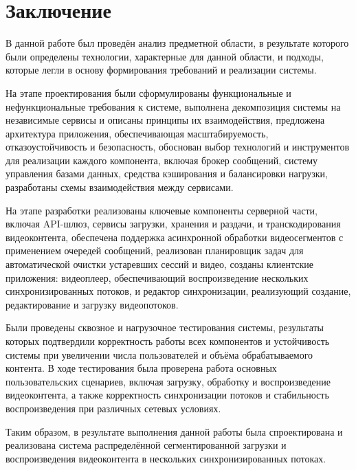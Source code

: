 \chapter*{Заключение} \label{ch-conclusion}

	В данной работе был проведён анализ предметной области, в результате которого были определены технологии, характерные для данной области, и подходы, которые легли в основу формирования требований и реализации системы.

	На этапе проектирования были сформулированы функциональные и нефункциональные требования к системе, выполнена декомпозиция системы на независимые сервисы и описаны принципы их взаимодействия, предложена архитектура приложения, обеспечивающая масштабируемость, отказоустойчивость и безопасность, обоснован выбор технологий и инструментов для реализации каждого компонента, включая брокер сообщений, систему управления базами данных, средства кэширования и балансировки нагрузки, разработаны схемы взаимодействия между сервисами.

	На этапе разработки реализованы ключевые компоненты серверной части, включая API-шлюз, сервисы загрузки, хранения и раздачи, и транскодирования видеоконтента, обеспечена поддержка асинхронной обработки видеосегментов с применением очередей сообщений, реализован планировщик задач для автоматической очистки устаревших сессий и видео, созданы клиентские приложения: видеоплеер, обеспечивающий воспроизведение нескольких синхронизированных потоков, и редактор синхронизации, реализующий создание, редактирование и загрузку видеопотоков.

	Были проведены сквозное и нагрузочное тестирования системы, результаты которых подтвердили корректность работы всех компонентов и устойчивость системы при увеличении числа пользователей и объёма обрабатываемого контента. В ходе тестирования была проверена работа основных пользовательских сценариев, включая загрузку, обработку и воспроизведение видеоконтента, а также корректность синхронизации потоков и стабильность воспроизведения при различных сетевых условиях.

	Таким образом, в результате выполнения данной работы была спроектирована и реализована система распределённой сегментированной загрузки и воспроизведения видеоконтента в нескольких синхронизированных потоках.